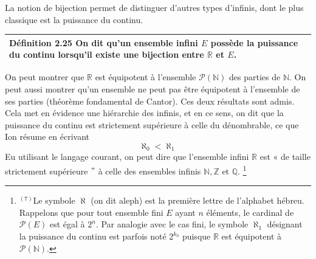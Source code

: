 \documentclass[10pt]{book}
\begin{document}
La notion de bijection permet de distinguer d'autres types d'infinis, dont le plus classique est la puissance du continu.\\
\begin{tabular}{|p{12cm}|}
\hline
\textbf{Définition 2.25} On dit qu'un ensemble infini $E$ possède la puissance du continu lorsqu'il existe une bijection entre $\mathbb{R}$ et $E$.\\
\hline
\end{tabular}


On peut montrer que $\mathbb{R}$ est équipotent à l'ensemble $\mathcal{P}(\mathbb{N})$ des parties de $\mathbb{N}$. On peut aussi montrer qu'un ensemble ne peut pas être équipotent à l'ensemble de ses parties (théorème fondamental de Cantor). Ces deux résultats sont admis. Cela met en évidence une hiérarchie des infinis, et en ce sens, on dit que la puissance du continu est strictement supérieure à celle du dénombrable, ce que Ion résume en écrivant
$$
\aleph_{0}<\aleph_{1}
$$
Eu utilisant le langage courant, on peut dire que l'ensemble infini $\mathbb{R}$ est « de taille strictement supérieure $"$ à celle des ensembles infinis $\mathbb{N}, \mathbb{Z}$ et $\mathbb{Q}$.
\footnote{${ }^{(7)}$Le symbole $\aleph$ (on dit aleph) est la première lettre de l'alphabet hébreu. Rappelons que pour tout ensemble fini $E$ ayant $n$ éléments, le cardinal de $\mathcal{P}(E)$ est égal à $2^{n}$. Par analogie avec le cas fini, le symbole $\aleph_{1}$ désignant la puissance du continu est parfois noté $2^{k_{0}}$ puisque $\mathbb{R}$ est équipotent à $\mathcal{P}(\mathbb{N})$.}\\
\end{document}
